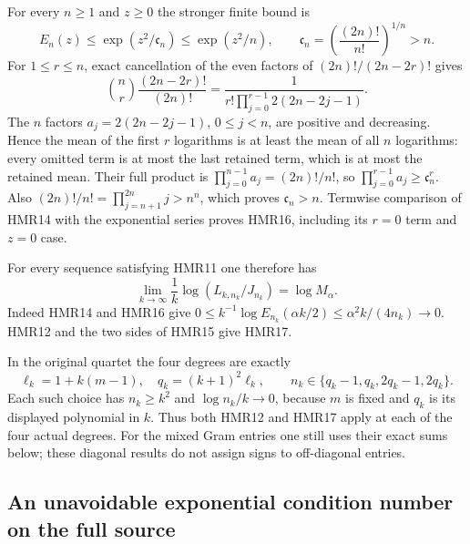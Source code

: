 For every $n\geq1$ and $z\geq0$ the stronger finite bound is
\[
 \boxed{\displaystyle
 E_n(z)\leq\exp(z^2/\mathfrak c_n)\leq\exp(z^2/n),
 \qquad \mathfrak c_n=\left(\frac{(2n)!}{n!}\right)^{1/n}>n.}
 \tag{HMR16}
\]
For $1\leq r\leq n$, exact cancellation of the even
factors of $(2n)!/(2n-2r)!$ gives
\[
 \binom nr\frac{(2n-2r)!}{(2n)!}
 =\frac1{r!\prod_{j=0}^{r-1}2(2n-2j-1)}.
\]
The $n$ factors $a_j=2(2n-2j-1)$, $0\leq j<n$,
are positive and decreasing. Hence the mean of the
first $r$ logarithms is at least the mean of all
$n$ logarithms: every omitted term is at most
the last retained term, which is at most the
retained mean. Their full product is
$\prod_{j=0}^{n-1}a_j=(2n)!/n!$, so
$\prod_{j=0}^{r-1}a_j\geq\mathfrak c_n^r$.
Also $(2n)!/n!=\prod_{j=n+1}^{2n}j>n^n$,
which proves $\mathfrak c_n>n$.
Termwise comparison of HMR14 with the exponential
series proves HMR16, including its $r=0$ term
and $z=0$ case.

For every sequence satisfying HMR11 one therefore has
\[
 \boxed{\displaystyle
 \lim_{k\to\infty}\frac1k\log(L_{k,n_k}/J_{n_k})
 =\log M_\alpha.}
 \tag{HMR17}
\]
Indeed HMR14 and HMR16 give
$0\leq k^{-1}\log E_{n_k}(\alpha k/2)
\leq\alpha^2k/(4n_k)\to0$.
HMR12 and the two sides of HMR15 give HMR17.

In the original quartet the four degrees are exactly
\[
 \ell_k=1+k(m-1),\quad q_k=(k+1)^2\ell_k,\qquad
 n_k\in\{q_k-1,q_k,2q_k-1,2q_k\}.
 \tag{HMR18}
\]
Each such choice has $n_k\geq k^2$ and $\log n_k/k\to0$,
because $m$ is fixed and $q_k$ is its displayed polynomial
in $k$. Thus both HMR12 and HMR17 apply at each of the
four actual degrees. For the mixed Gram entries one still
uses their exact sums below; these diagonal results do not
assign signs to off-diagonal entries.

\subsection{An unavoidable exponential condition number on the full source}

